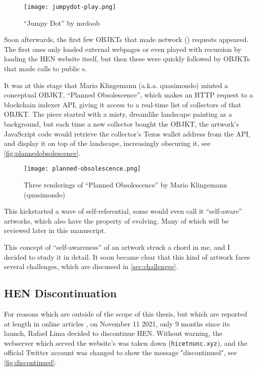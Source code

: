 \begin{figure}[H]
    \centering
    \texttt{[image: jumpydot-play.png]}
    \caption[``Jumpy Dot'' by mrdoob]{``Jumpy Dot'' by mrdoob}
    \label{fig:jumpydot}
\end{figure}


Soon afterwards, the first few OBJKTs that made network () requests appeared. The first ones only loaded external webpages or even played with recursion by loading the HEN website itself, but then these were quickly followed by OBJKTs that made calls to public s.

It was at this stage that Mario Klingemann (a.k.a. quasimondo) minted a conceptual OBJKT, ``Planned Obsolescence'', which makes an HTTP request to a blockchain indexer API, giving it access to a real-time list of collectors of that OBJKT. The piece started with a misty, dreamlike landscape painting as a background, but each time a new collector bought the OBJKT, the artwork's JavaScript code would retrieve the collector's Tezos wallet address from the API, and display it on top of the landscape, increasingly obscuring it, see \autoref{fig:plannedobsolescence}.

\begin{figure}[H]
    \centering
    \texttt{[image: planned-obsolescence.png]}
    \caption[``Planned Obsolescence'' by quasimondo]{Three renderings of ``Planned Obsolescence'' by Mario Klingemann (quasimondo)}
    \label{fig:plannedobsolescence}
\end{figure}


This kickstarted a wave of self-referential, some would even call it ``self-aware'' artworks, which also have the property of evolving. Many of which will be reviewed later in this manuscript.

This concept of ``self-awareness'' of an artwork struck a chord in me, and I decided to study it in detail. It soon became clear that this kind of artwork faces several challenges, which are discussed in \autoref{sec:challenges}.


\subsection*{HEN Discontinuation}
\label{sub:teia}

For reasons which are outside of the scope of this thesis, but which are reported at length in online articles \cite{straeubigHENTimelineHentimeline2024} \cite{siqueiraHicNuncStory2021a} \cite{tezosHistoryTeiaArt2022} \cite{smithHicNuncPart2022}, on November 11 2021, only 9 months since its launch, Rafael Lima decided to discontinue HEN. Without warning, the webserver which served the website's  was taken down (\texttt{hicetnunc.xyz}), and the official Twitter account was changed to show the message "discontinued", see \autoref{fig:discontinued}.

